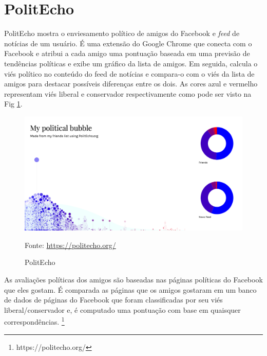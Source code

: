 \section{PolitEcho}

PolitEcho mostra o enviesamento político de amigos do Facebook e \textit{feed} de notícias de um usuário. É uma extensão do Google Chrome que conecta com o Facebook e atribui a cada amigo uma pontuação baseada em uma previsão de tendências políticas e exibe um gráfico da lista de amigos. Em seguida, calcula o viés político no conteúdo do feed de notícias e compara-o com o viés da lista de amigos para destacar possíveis diferenças entre os dois. As cores azul e vermelho representam viés liberal e conservador respectivamente como pode ser visto na Fig \ref{fig05}.


\begin{figure}[h]
	\centering
	\includegraphics[keepaspectratio=true,scale=0.3]{figuras/politecho.png}
	\caption{PolitEcho}
	Fonte: \url{https://politecho.org/}
	\label{fig05}
\end{figure}


As avaliações políticas dos amigos são baseadas nas páginas políticas do Facebook que eles gostam. É comparada as páginas que os amigos gostaram em um banco de dados de páginas do Facebook que foram classificadas por seu viés liberal/conservador e, é computado uma pontuação com base em quaisquer correspondências. \footnote{https://politecho.org/}
